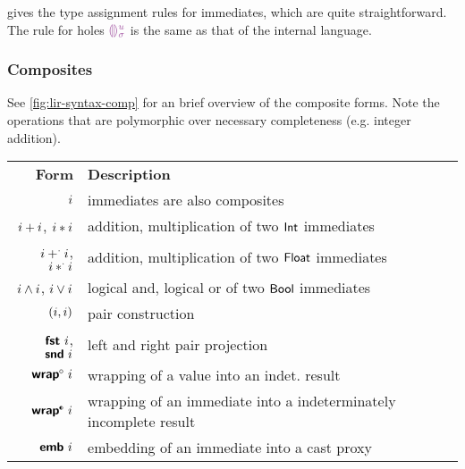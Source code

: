 \documentclass[index.tex]{subfiles}
\begin{document}
 gives the type assignment rules for immediates, which are quite
straightforward. The rule for holes $\EEHole{\SortHoleIdVar}{\SortHoleEnvVar}$ is the same as
that of the internal \Hazel{} language.

\subsubsection{Composites}
\label{sec:lir-composites}
See \cref{fig:lir-syntax-comp} for an brief overview of the composite forms. Note the operations that
are polymorphic over necessary completeness (e.g. integer addition).

\begin{table}
  \begin{center}
    \begin{tabular}{rl}
      \textbf{Form} & \textbf{Description} \\

      $i$ 
        & immediates are also composites \\
      
      $i + i$, $i * i$
        & addition, multiplication of two $\textsf{Int}$ immediates \\

      $i +^{\cdot} i$, $i *^{\cdot} i$
        & addition, multiplication of two $\textsf{Float}$ immediates \\

      $i \land i$, $i \lor i$
        & logical and, logical or of two $\textsf{Bool}$ immediates \\

      $(i, i)$
        & pair construction \\

      $\textsf{\textbf{fst}}~ i$, $\textsf{\textbf{snd}}~ i$
        & left and right pair projection \\

      $\EWrapIntoNI{\SortImmVar}$
        & wrapping of a value into an indet. result \\

      $\EWrapIntoII{\SortImmVar}$
        & wrapping of an immediate into a indeterminately incomplete
        result \\

      $\textsf{\textbf{emb}}~ i$
        & embedding of an immediate into a cast proxy \\


\end{tabular}
\end{center}
\end{table}
\end{document}
